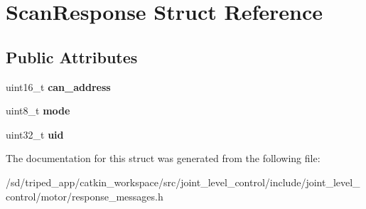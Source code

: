 \hypertarget{structScanResponse}{}\section{Scan\+Response Struct Reference}
\label{structScanResponse}
\subsection*{Public Attributes}
\begin{DoxyCompactItemize}
\item 
\mbox{\label{structScanResponse_a5984426066ffa49ea49e9a1093a1f30b}} 
uint16\+\_\+t {\bfseries can\+\_\+address}
\item 
\mbox{\label{structScanResponse_a9189a41b9ad5fc226a4c18f04399ec84}} 
uint8\+\_\+t {\bfseries mode}
\item 
\mbox{\label{structScanResponse_a03bd906c8ce581d26cf4857bf881b9cf}} 
uint32\+\_\+t {\bfseries uid}
\end{DoxyCompactItemize}


The documentation for this struct was generated from the following file\+:\begin{DoxyCompactItemize}
\item 
/sd/triped\+\_\+app/catkin\+\_\+workspace/src/joint\+\_\+level\+\_\+control/include/joint\+\_\+level\+\_\+control/motor/response\+\_\+messages.\+h\end{DoxyCompactItemize}
